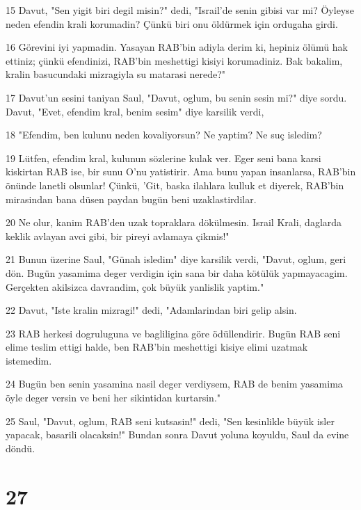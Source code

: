 \par 15 Davut, "Sen yigit biri degil misin?" dedi, "Israil'de senin gibisi var mi? Öyleyse neden efendin krali korumadin? Çünkü biri onu öldürmek için ordugaha girdi.
\par 16 Görevini iyi yapmadin. Yasayan RAB'bin adiyla derim ki, hepiniz ölümü hak ettiniz; çünkü efendinizi, RAB'bin meshettigi kisiyi korumadiniz. Bak bakalim, kralin basucundaki mizragiyla su matarasi nerede?"
\par 17 Davut'un sesini taniyan Saul, "Davut, oglum, bu senin sesin mi?" diye sordu. Davut, "Evet, efendim kral, benim sesim" diye karsilik verdi,
\par 18 "Efendim, ben kulunu neden kovaliyorsun? Ne yaptim? Ne suç isledim?
\par 19 Lütfen, efendim kral, kulunun sözlerine kulak ver. Eger seni bana karsi kiskirtan RAB ise, bir sunu O'nu yatistirir. Ama bunu yapan insanlarsa, RAB'bin önünde lanetli olsunlar! Çünkü, 'Git, baska ilahlara kulluk et diyerek, RAB'bin mirasindan bana düsen paydan bugün beni uzaklastirdilar.
\par 20 Ne olur, kanim RAB'den uzak topraklara dökülmesin. Israil Krali, daglarda keklik avlayan avci gibi, bir pireyi avlamaya çikmis!"
\par 21 Bunun üzerine Saul, "Günah isledim" diye karsilik verdi, "Davut, oglum, geri dön. Bugün yasamima deger verdigin için sana bir daha kötülük yapmayacagim. Gerçekten akilsizca davrandim, çok büyük yanlislik yaptim."
\par 22 Davut, "Iste kralin mizragi!" dedi, "Adamlarindan biri gelip alsin.
\par 23 RAB herkesi dogruluguna ve bagliligina göre ödüllendirir. Bugün RAB seni elime teslim ettigi halde, ben RAB'bin meshettigi kisiye elimi uzatmak istemedim.
\par 24 Bugün ben senin yasamina nasil deger verdiysem, RAB de benim yasamima öyle deger versin ve beni her sikintidan kurtarsin."
\par 25 Saul, "Davut, oglum, RAB seni kutsasin!" dedi, "Sen kesinlikle büyük isler yapacak, basarili olacaksin!" Bundan sonra Davut yoluna koyuldu, Saul da evine döndü.

\chapter{27}

